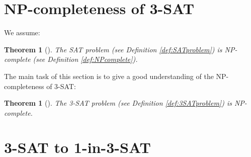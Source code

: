 \documentclass[a4paper]{report}
\newtheorem{thm}[defi]{Theorem}
\begin{document}
\section{NP-completeness of 3-SAT}
\label{sec:3SATNPcomp}

We assume:
\begin{thm}[{{\cite[Theorem 1]{Cook1971NP}}}]\label{thm:SATNPcomplete}
  The SAT problem (see Definition \ref{def:SATproblem}) is NP-complete (see Definition \ref{def:NPcomplete}).
\end{thm}

The main task of this section is to give a good understanding of the NP-completeness of 3-SAT:
\begin{thm}[{{\cite[Theorem 2]{Cook1971NP}}}]\label{thm:SATNPcomplete}
  The 3-SAT problem (see Definition \ref{def:3SATproblem}) is NP-complete.
\end{thm}





\section{3-SAT to 1-in-3-SAT}
\label{sec:3satto13}





\end{document}

